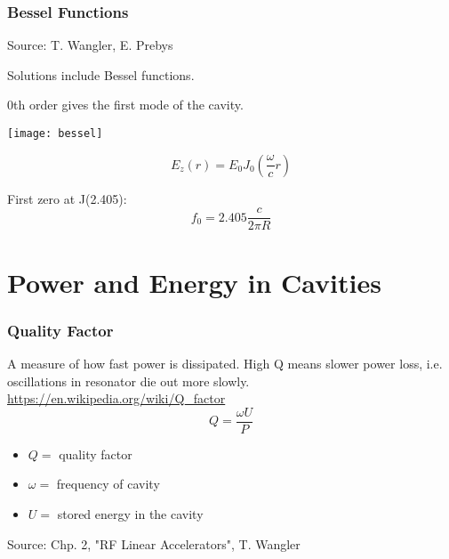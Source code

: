 \documentclass[professionalfonts,t]{beamer}
\begin{document}
\begin{frame}
\frametitle{Bessel Functions}
\vspace{-1em}
\hfill Source: T. Wangler, E. Prebys
	
	Solutions include Bessel functions. 
	
	0th order gives the first mode of the cavity.

	\begin{minipage}{0.5\textwidth}
		\texttt{[image: bessel]}
	\end{minipage}
	\begin{minipage}{0.4\textwidth}
	\begin{equation}
		E_z\left(r\right) = E_0 J_0 \left(\frac{\omega}{c} r\right)
	\end{equation}
	
	First zero at J(2.405):
	\begin{equation}
		f_0 = 2.405 \frac{c}{2 \pi R}
	\end{equation}
	\end{minipage}

\end{frame}

\fi



\iftrue

\section{Power and Energy in Cavities }

\begin{frame}
	\frametitle{Quality Factor}
	A measure of how fast power is dissipated. 
	High Q means slower power loss, i.e. oscillations in resonator die out more slowly. 
	\url{https://en.wikipedia.org/wiki/Q_factor}
	\begin{equation}
		Q= \frac{\omega U}{P}
	\end{equation}
	\begin{itemize}
		\item $Q =$ quality factor
		\item $\omega =$ frequency of cavity
		\item $U =$ stored energy in the cavity 
	\end{itemize}

\vspace{1em}

Source: Chp. 2, "RF Linear Accelerators", T. Wangler
\end{frame}
\end{document}
